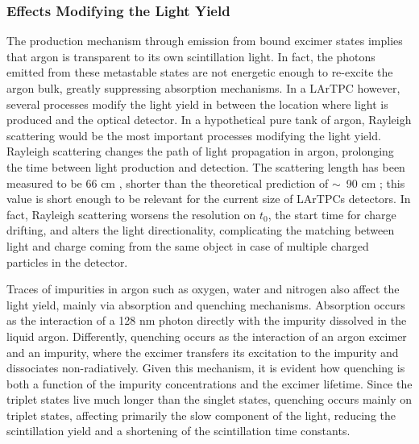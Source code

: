 \subsubsection{Effects Modifying the  Light Yield}
The production mechanism through emission from bound excimer states implies that argon is  transparent to its own scintillation light. In fact, the photons emitted from these metastable states are not energetic enough to re-excite the argon bulk, greatly suppressing absorption mechanisms. In a LArTPC however, several processes modify the light yield in between the location where light is produced and the optical detector. In a hypothetical pure tank of argon, Rayleigh scattering would be the most important processes modifying the light yield. Rayleigh scattering changes the path of light propagation in argon, prolonging the time between light production and detection.  The scattering length has been measured to be 66 cm \cite{Ishida1997} , shorter than the theoretical prediction of $\sim$~90 cm \cite{Teague1968}; this value is short enough to be relevant for the current size of LArTPCs detectors. In fact, Rayleigh scattering worsens the resolution on $t_0$, the start time for charge drifting, and  alters the light directionality, complicating the matching between light and charge coming from the same object in case of multiple charged particles in the detector. 

Traces of impurities in argon such as oxygen, water and nitrogen  also affect the light yield, mainly  via absorption and quenching mechanisms. 
Absorption occurs as the interaction of a 128 nm photon directly with the impurity dissolved in the liquid argon.  Differently, quenching occurs as the interaction of an argon excimer and an impurity, where the excimer transfers its excitation to the impurity and  dissociates non-radiatively.  Given this mechanism, it is evident how quenching is both a function of the impurity concentrations and the excimer lifetime.  Since the triplet states live much longer than the singlet states,  quenching occurs mainly on triplet states, affecting primarily the slow component of the light,  reducing the scintillation yield and a shortening of the scintillation time constants.  


